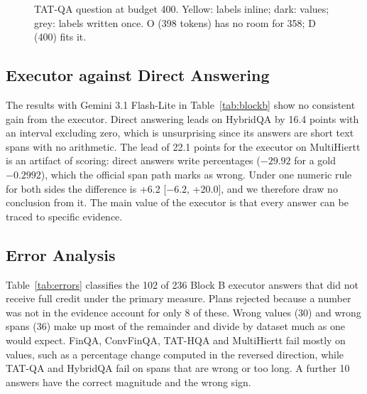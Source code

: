 \documentclass[11pt]{article}
\begin{document}
\begin{table}[t]
\centering\footnotesize\setlength{\tabcolsep}{2.2pt}

\caption{Block B (\%), Gemini 3.1 Flash-Lite: executor against direct answering on D
evidence. MultiHiertt is official F1; under one numeric rule the gap is +6.2.}
\label{tab:blockb}
\end{table}

\begin{figure}[t]
\centering
\resizebox{\columnwidth}{!}{}
\caption{TAT-QA question at budget 400. Yellow: labels inline; dark: values; grey:
labels written once. O (398 tokens) has no room for 358; D (400) fits it.}
\label{fig:replay}
\end{figure}

\subsection{Executor against Direct Answering}
The results with Gemini 3.1 Flash-Lite in Table~\ref{tab:blockb} show no consistent gain
from the executor. Direct answering leads on HybridQA by 16.4 points with an interval
excluding zero, which is unsurprising since its answers are short text spans with no
arithmetic. The lead of 22.1 points for the executor on MultiHiertt is an artifact of
scoring: direct answers write percentages ($-29.92$ for a gold $-0.2992$), which the
official span path marks as wrong. Under one numeric rule for both sides the difference
is +6.2 [$-6.2$, +20.0], and we therefore draw no conclusion from it. The main value of
the executor is that every answer can be traced to specific evidence.

\subsection{Error Analysis}
Table~\ref{tab:errors} classifies the 102 of 236 Block B executor answers that did not
receive full credit under the primary measure. Plans rejected because a number was not
in the evidence account for only 8 of these. Wrong values (30) and wrong spans (36) make
up most of the remainder and divide by dataset much as one would expect. FinQA,
ConvFinQA, TAT-HQA and MultiHiertt fail mostly on values, such as a percentage change
computed in the reversed direction, while TAT-QA and HybridQA fail on spans that are
wrong or too long. A further 10 answers have the correct magnitude and the wrong sign.

\begin{table}[t]
\centering\footnotesize\setlength{\tabcolsep}{3.2pt}

\caption{Block B executor answers without full credit: wrong value (Val), wrong sign,
wrong span or text (Span), value not in evidence (Grnd), abstained (Abst), other.}
\label{tab:errors}
\end{table}
\end{document}

